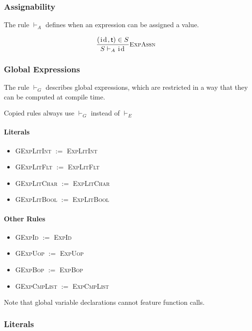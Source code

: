 \documentclass{article}
\newcommand{\code}[1]{\lstinline[columns=fixed]{#1}}
\newcommand{\subsubsubsection}{\paragraph}
\begin{document}
			\subsubsection{Assignability}
			
				The rule $\vdash_A$ defines when an expression can be assigned a value.
				
				\begin{align*}
					\frac{(\textnormal{\code{id}},\mathsf{t})\in S}{S\vdash_A\textnormal{\code{id}}}\textsc{\small{ExpAssn}}
				\end{align*}
				
			\subsubsection{Global Expressions}
			
				The rule $\vdash_G$ describes global expressions, which are restricted in a way that they can be computed at compile time.
				
				Copied rules always use $\vdash_G$ instead of $\vdash_E$
				
				\subsubsubsection{Literals}
				
					\begin{itemize}
						\item \textsc{GExpLitInt} $:=$ \textsc{ExpLitInt}
						\item \textsc{GExpLitFlt} $:=$ \textsc{ExpLitFlt}
						\item \textsc{GExpLitChar} $:=$ \textsc{ExpLitChar}
						\item \textsc{GExpLitBool} $:=$ \textsc{ExpLitBool}
					\end{itemize}
				
				\subsubsubsection{Other Rules}
				
					\begin{itemize}
						\item \textsc{GExpId} $:=$ \textsc{ExpId}
						\item \textsc{GExpUop} $:=$ \textsc{ExpUop}
						\item \textsc{GExpBop} $:=$ \textsc{ExpBop}
						\item \textsc{GExpCmpList} $:=$ \textsc{ExpCmpList}
					\end{itemize}
				
					Note that global variable declarations cannot feature function calls.
		
			\subsubsection{Literals}
			
\end{document}
